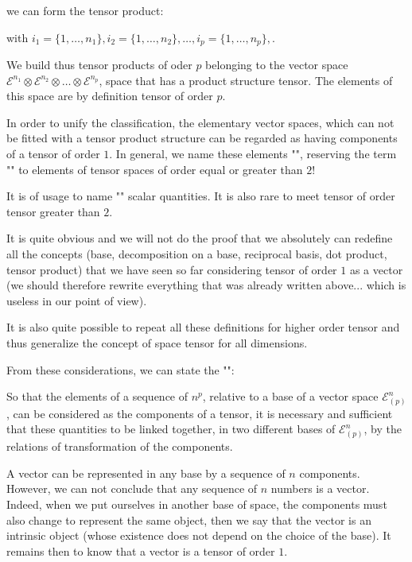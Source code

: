 	we can form the tensor product:
	
with $i_1=\{1,\ldots,n_1\},i_2=\{1,\ldots,n_2\},\ldots,i_p=\{1,\ldots,n_p\},$.

	We build thus tensor products of oder $p$ belonging to the vector space $\mathcal{E}^{n_1}\otimes\mathcal{E}^{n_2}\otimes\ldots \otimes\mathcal{E}^{n_p}$, space that has a product structure tensor. The elements of this space are by definition tensor of order $p$.

	In order to unify the classification, the elementary vector spaces, which can not be fitted with a tensor product structure can be regarded as having components of a tensor of order $1$. In general, we name these elements "", reserving the term "" to elements of tensor spaces of order equal or greater than $2$!
	\begin{tcolorbox}[title=Remark,colframe=black,arc=10pt]
	It is of usage to name "" scalar quantities. It is also rare to meet tensor of order tensor greater than $2$.
	\end{tcolorbox}
	It is quite obvious and we will not do the proof  that we absolutely can redefine all the concepts (base, decomposition on a base, reciprocal basis, dot product, tensor product) that we have seen so far considering tensor of order $1$ as a vector (we should therefore rewrite everything that was already written above... which is useless in our point of view).

	It is also quite possible to repeat all these definitions for higher order tensor and thus generalize the concept of space tensor for all dimensions.

	From these considerations, we can state the "":
	
	So that the elements of a sequence of $n^p$, relative to a base of a vector space $\mathcal{E}_{(p)}^n$, can be considered as the components of a tensor, it is necessary and sufficient that these quantities to be linked together, in two different bases of $\mathcal{E}_{(p)}^n$, by the relations of transformation of the components.
	\begin{tcolorbox}[title=Remark,colframe=black,arc=10pt]
	A vector can be represented in any base by a sequence of $n$ components. However, we can not conclude that any sequence of $n$ numbers is a vector. Indeed, when we put ourselves in another base of space, the components must also change to represent the same object, then we say that the vector is an intrinsic object (whose existence does not depend on the choice of the base). It remains then to know that a vector is a tensor of order $1$.	
	\end{tcolorbox}

